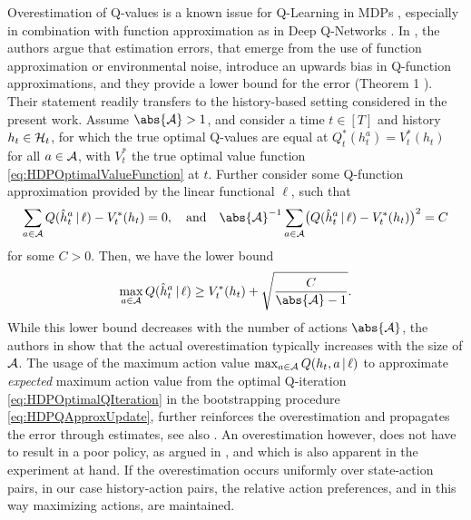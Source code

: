 \documentclass[
    a4paper,
    11pt,
    bibliography=totoc,
    listof=totoc,      
    headinclude=true,
    cleardoublepage=empty,
]{scrbook}
\theoremstyle{plain}
\theoremstyle{definition}
\theoremstyle{remark}
\newcommand{\SpaceA}{{\cal A}}
\newcommand{\SpaceH}{{\cal H}}
\begin{document}
Overestimation of Q-values is a known issue for Q-Learning in MDPs
\cite{hasselt2010_dq,hasselt2016_drlwdq}, especially in combination with
function approximation as in Deep Q-Networks \cite{mnih2015_hctdrl}. In
\cite{hasselt2016_drlwdq}, the authors argue that estimation errors, that 
emerge from the use of function approximation or environmental noise,
introduce an upwards bias in Q-function approximations, and they provide a
lower bound for the error (Theorem 1 \cite{hasselt2016_drlwdq}). Their 
statement readily transfers to the history-based setting considered in the 
present work. Assume $\abs{\SpaceA} >1$, and consider a time $t\in[T]$ and 
history $h_t\in\SpaceH_t$, for which the true optimal Q-values are equal at 
$Q_t^*(h_t^a) = V^*_t(h_t)$ for all $a\in\SpaceA$, with $V_t^*$ the true 
optimal value function \eqref{eq:HDPOptimalValueFunction} at $t$. Further 
consider some Q-function approximation provided by the linear functional 
$\ell$, such that
\[
    \sum_{a\in\SpaceA} Q(\hat{h}^a_t\,|\,\ell) -  V_t^*(h_t) = 0,
    \quad \text{and} \quad
    \abs{\SpaceA}^{-1} \sum_{a\in\SpaceA} 
        \bigl(Q(\hat{h}^a_t\,|\,\ell) -  V_t^*(h_t)\bigr)^2 = C
\]
for some $C>0$. Then, we have the lower bound
\[
    \max_{a\in\SpaceA} Q(\hat{h}^a_t\,|\,\ell) 
    \geq V_t^*(h_t) + \sqrt{\frac{C}{\abs{\SpaceA}-1}}.
\]
While this lower bound decreases with the number of actions $\abs{\SpaceA}$,
the authors in \cite{hasselt2016_drlwdq} show that the actual overestimation
typically increases with the size of $\SpaceA$. The usage of the maximum 
action value $\max_{a\in\SpaceA} Q(h_t,a\,|\,\ell)$ to approximate 
\textit{expected} maximum action value from the optimal Q-iteration 
\eqref{eq:HDPOptimalQIteration} in the bootstrapping procedure 
\eqref{eq:HDPQApproxUpdate}, further reinforces the overestimation and
propagates the error through estimates, see also \cite{hasselt2010_dq}. An
overestimation however, does not have to result in a poor policy, as argued in
\cite{hasselt2016_drlwdq}, and which is also apparent in the experiment at
hand. If the overestimation occurs uniformly over state-action pairs, in our
case history-action pairs, the relative action preferences, and in this way
maximizing actions, are maintained. 
\end{document}
